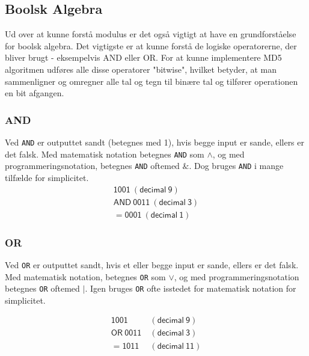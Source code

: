 \documentclass[12pt]{article}
\begin{document}
\subsection{Boolsk Algebra}
Ud over at kunne forstå modulus er det også vigtigt at have en grundforståelse for boolsk algebra. Det vigtigste er at kunne forstå de logiske operatorerne, der bliver brugt - eksempelvis AND eller OR. For at kunne implementere MD5 algoritmen udføres alle disse operatorer "bitwise", hvilket betyder, at man sammenligner og omregner alle tal og tegn til binære tal og tilfører operationen en bit afgangen.  



\subsubsection{AND}
Ved \verb|AND| er outputtet sandt (betegnes med 1), hvis begge input er sande, ellers er det falsk. Med matematisk notation betegnes \verb|AND| som \(\wedge\), og med programmeringsnotation, betegnes \verb|AND| ofte\footnotemark[1] med \(\&\). Dog bruges \verb|AND| i mange tilfælde for simplicitet. 
\begin{equation}
\begin{split}
\mathsf{     1001 \ (decimal\ 9) } \\
\mathsf{AND\ 0011 \ (decimal\ 3) } \\
\mathsf{   = 0001 \ (decimal\ 1) }
\end{split}
\end{equation}

\subsubsection{OR}
Ved \verb|OR| er outputtet sandt, hvis et eller begge input er sande, ellers er det falsk. Med matematisk notation, betegnes \verb|OR| som \(\vee\), og med programmeringsnotation betegnes \verb|OR| ofte\footnotemark[1] med \(|\). Igen bruges \verb|OR| ofte isstedet for matematisk notation for simplicitet.  

\begin{equation}
\begin{split}
\mathsf{     1001}& \ \mathsf{(decimal\ 9 ) } \\
\mathsf{OR \ 0011}& \ \mathsf{(decimal\ 3 ) } \\
\mathsf{   = 1011}& \ \mathsf{(decimal\ 11) }
\end{split}
\end{equation}
\end{document}
